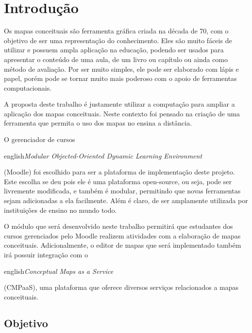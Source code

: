 \documentclass[
	12pt,				%
	openright,			%
	oneside,			%
	a4paper,			%
	english,			%
	french,				%
	spanish,			%
	brazil				%
	]{abntex2}
\begin{document}
\chapter{Introdução}

Os mapas conceituais são ferramenta gráfica criada na década de 70, com o objetivo de ser uma representação do conhecimento. Eles são muito fáceis de utilizar e possuem ampla aplicação na educação, podendo ser usados para apresentar o conteúdo de uma aula, de um livro ou capítulo ou ainda como método de avaliação. Por ser muito simples, ele pode ser elaborado com lápis e papel, porém pode se tornar muito mais poderoso com o apoio de ferramentas computacionais.

A proposta deste trabalho é justamente utilizar a computação para ampliar a aplicação dos mapas conceituais. Neste contexto foi pensado na criação de uma ferramenta que permita o uso dos mapas no ensina a distância. 

O gerenciador de cursos \begin{otherlanguage*}{english}\textit{Modular Objected-Oriented Dynamic Learning Environment}\end{otherlanguage*} (Moodle) foi escolhido para ser a plataforma de implementação deste projeto. Este escolha se deu pois ele é uma plataforma open-source, ou seja, pode ser livremente modificada, e também é modular, permitindo que novas ferramentas sejam adicionadas a ela facilmente. Além é claro, de ser amplamente utilizada por instituições de ensino no mundo todo.

O módulo que será desenvolvido neste trabalho permitirá que estudantes dos cursos gerenciados pelo Moodle realizem atividades com a elaboração de mapas conceituais. Adicionalmente, o editor de mapas que será implementado também irá possuir integração com o \begin{otherlanguage*}{english}\textit{Conceptual Maps as a Service}\end{otherlanguage*}  (CMPaaS), uma plataforma que oferece diversos serviços relacionados a mapas conceituais.


\section{Objetivo}
\end{document}
